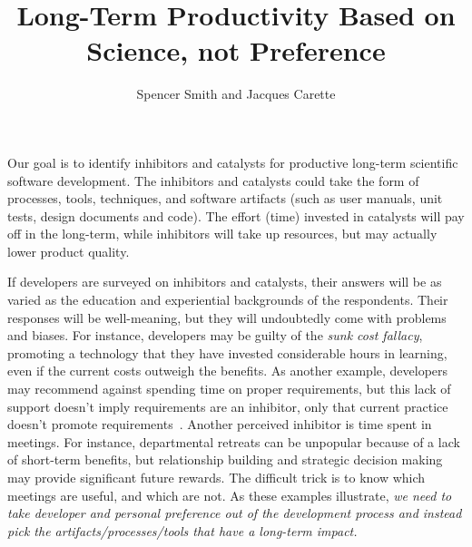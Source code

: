 \documentclass[sigconf, authorversion, nonacm]{acmart}
\begin{document}
\title{Long-Term Productivity Based on Science, not Preference}

\author{Spencer Smith and Jacques Carette}


\maketitle

Our goal is to identify inhibitors and catalysts for productive long-term
scientific software development.  The inhibitors and catalysts could take the
form of processes, tools, techniques, and software artifacts (such as user
manuals, unit tests, design documents and code). The effort (time) invested in
catalysts will pay off in the long-term, while inhibitors will take up
resources, but may actually lower product quality.

If developers are surveyed on inhibitors and catalysts, their answers will be as
varied as the education and experiential backgrounds of the respondents. Their
responses will be well-meaning, but they will undoubtedly come with problems and
biases.  For instance, developers may be guilty of the \emph{sunk cost fallacy},
promoting a technology that they have invested considerable hours in learning,
even if the current costs outweigh the benefits. As another example, developers
may recommend against spending time on proper requirements, but this lack of
support doesn't imply requirements are an inhibitor, only that current practice
doesn't promote requirements~\cite{HeatonAndCarver2015}. Another
perceived inhibitor is time spent in meetings. For instance, departmental
retreats can be unpopular because of a lack of short-term benefits, but
relationship building and strategic decision making may provide significant
future rewards. The difficult trick is to know which meetings are useful, and
which are not.  As these examples illustrate, \emph{we need to take developer
and personal preference out of the development process and instead pick the
artifacts/processes/tools that have a long-term impact.}
\end{document}
